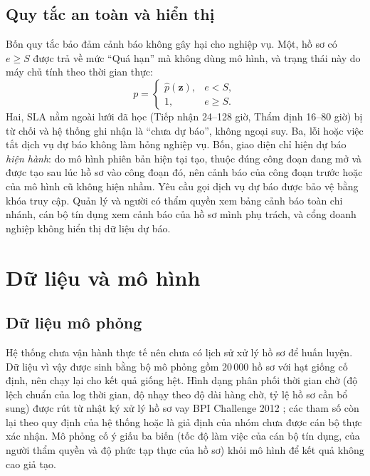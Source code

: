 \documentclass[journal]{IEEEtran}
\begin{document}
\subsection{Quy tắc an toàn và hiển thị}
Bốn quy tắc bảo đảm cảnh báo không gây hại cho nghiệp vụ. Một, hồ sơ có $e\ge S$ được trả về mức ``Quá hạn'' mà không dùng mô hình, và trạng thái này do máy chủ tính theo thời gian thực:
\begin{equation}
p=\begin{cases}
\hat{p}(\mathbf{z}), & e<S,\\
1, & e\ge S.
\end{cases}
\end{equation}Hai, SLA nằm ngoài lưới đã học (Tiếp nhận 24--128 giờ, Thẩm định 16--80 giờ) bị từ chối và hệ thống ghi nhận là ``chưa dự báo'', không ngoại suy. Ba, lỗi hoặc việc tắt dịch vụ dự báo không làm hỏng nghiệp vụ. Bốn, giao diện chỉ hiện dự báo \emph{hiện hành}: do mô hình phiên bản hiện tại tạo, thuộc đúng công đoạn đang mở và được tạo sau lúc hồ sơ vào công đoạn đó, nên cảnh báo của công đoạn trước hoặc của mô hình cũ không hiện nhầm. Yêu cầu gọi dịch vụ dự báo được bảo vệ bằng khóa truy cập. Quản lý và người có thẩm quyền xem bảng cảnh báo toàn chi nhánh, cán bộ tín dụng xem cảnh báo của hồ sơ mình phụ trách, và cổng doanh nghiệp không hiển thị dữ liệu dự báo.

\section{Dữ liệu và mô hình}
\subsection{Dữ liệu mô phỏng}
Hệ thống chưa vận hành thực tế nên chưa có lịch sử xử lý hồ sơ để huấn luyện. Dữ liệu vì vậy được sinh bằng bộ mô phỏng gồm 20\,000 hồ sơ với hạt giống cố định, nên chạy lại cho kết quả giống hệt. Hình dạng phân phối thời gian chờ (độ lệch chuẩn của log thời gian, độ nhạy theo độ dài hàng chờ, tỷ lệ hồ sơ cần bổ sung) được rút từ nhật ký xử lý hồ sơ vay BPI Challenge 2012 \cite{bpic2012}; các tham số còn lại theo quy định của hệ thống hoặc là giả định của nhóm chưa được cán bộ thực xác nhận. Mô phỏng cố ý giấu ba biến (tốc độ làm việc của cán bộ tín dụng, của người thẩm quyền và độ phức tạp thực của hồ sơ) khỏi mô hình để kết quả không cao giả tạo.
\end{document}

